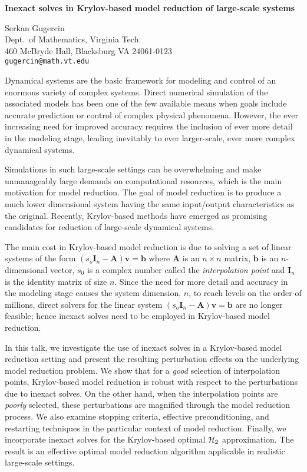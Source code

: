 \documentclass{report}
\begin{document}

\begin{center}
{\large
{\bf Inexact solves in Krylov-based model reduction of large-scale systems}}

	Serkan Gugercin \\
	Dept.~of Mathematics, Virginia Tech. \\
	460 McBryde Hall, Blacksburg VA 24061-0123 \\
	{\tt gugercin@math.vt.edu}
\end{center}
Dynamical systems are the basic framework for modeling and
control of an enormous variety of complex systems. Direct
numerical simulation of the associated models has been one
of the few available means when goals include accurate
prediction or control of complex physical phenomena.
However, the ever increasing need for improved accuracy
requires the inclusion of ever more detail in the modeling
stage, leading inevitably to ever larger-scale, ever more
complex dynamical systems.

Simulations in such
large-scale settings can be overwhelming and make
unmanageably large demands on computational resources, which
is the main motivation for model reduction. The goal of
model reduction is to produce a much lower dimensional
system having the same input/output characteristics as the
original. Recently, Krylov-based methods have emerged as
promising candidates for reduction of large-scale dynamical
systems.

The main cost in Krylov-based model reduction
is due to solving a set of linear systems of the form
$(s_o \mathbf{I}_n - \mathbf{A}) \mathbf{v} = \mathbf{b}$
where
$\mathbf{A}$ is an ${n \times n}$ matrix, $\mathbf{b}$ is an
$n$-dimensional vector, $s_0$ is a complex number called the
{\it interpolation point} and $\mathbf{I}_n$ is the identity
matrix of size $n$. Since the need for more detail and
accuracy in the modeling stage causes the system dimension,
$n$, to reach levels on the order of millions, direct
solvers for the linear system
$(s_o \mathbf{I}_n - \mathbf{A}) \mathbf{v} = \mathbf{b}$
are no longer feasible;
hence inexact solves need to be employed in Krylov-based
model reduction.

In this talk, we investigate the use of
inexact solves in a Krylov-based model reduction setting and
present the resulting perturbation effects on the underlying
model reduction problem. We show that for a \emph{good}
selection of interpolation points, Krylov-based model
reduction is robust with respect to the perturbations due to
inexact solves. On the other hand, when the interpolation
points are \emph{poorly} selected, these perturbations are
magnified through the model reduction process. We also
examine stopping criteria, effective preconditioning, and
restarting techniques in the particular context of model
reduction. Finally, we incorporate inexact solves for the
Krylov-based optimal ${\cal H}_2$ approximation. The result
is an effective optimal model reduction algorithm applicable
in realistic large-scale settings.



\end{document}
